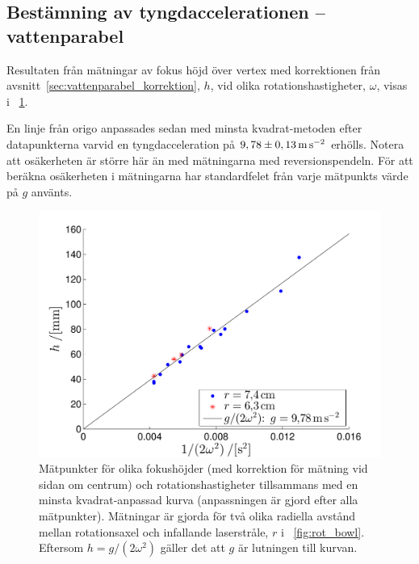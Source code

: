 \documentclass[11pt,a4paper]{article}
\newcommand{\figref}{\figurename~\ref}
\begin{document}
\subsection{Bestämning av tyngdaccelerationen -- vattenparabel}
Resultaten från mätningar av fokus höjd över vertex med korrektionen från avsnitt~\ref{sec:vattenparabel_korrektion}, $h$, vid olika rotationshastigheter, $\omega$, visas i \figref{fig:data_vattenparabel}. 

En linje från origo anpassades sedan med minsta kvadrat-metoden efter datapunkterna varvid en tyngdacceleration på $\unit[9,78\pm 0,13]{m\,s^{-2}}$ erhölls. Notera att osäkerheten är större här än med mätningarna med reversionspendeln. För att beräkna osäkerheten i mätningarna har standardfelet från varje mätpunkts värde på $g$ använts.



\begin{figure}\centering
\includegraphics[width=.7\textwidth]{g_minsta_kvadrat.pdf}
\caption{\label{fig:data_vattenparabel} Mätpunkter för olika fokushöjder (med korrektion för mätning vid sidan om centrum) och rotationshastigheter tillsammans med en minsta kvadrat-anpassad kurva (anpassningen är gjord efter alla mätpunkter). Mätningar är gjorda för två olika radiella avstånd mellan rotationsaxel och infallande laserstråle, $r$ i \figref{fig:rot_bowl}.
Eftersom $h=g/(2\omega^2)$ gäller det att $g$ är lutningen till kurvan.}
\end{figure}
\end{document}
